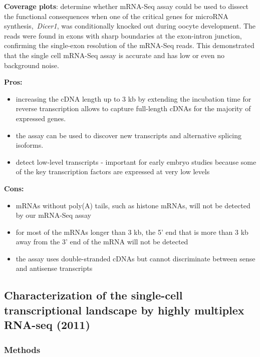 \textbf{Coverage plots}: determine whether mRNA-Seq assay could be used
to dissect the functional consequences when one of the critical genes
for microRNA synthesis,~\emph{Dicer1}, was conditionally knocked out
during oocyte development. The reads were found in exons with sharp
boundaries at the exon-intron junction, confirming the single-exon
resolution of the mRNA-Seq reads. This demonstrated that the single cell
mRNA-Seq assay is accurate and has low or even no background noise.

\textbf{Pros:}

\begin{itemize}
\tightlist
\item
  increasing the cDNA length up to 3 kb by extending the incubation time
  for reverse transcription allows to capture full-length cDNAs for the
  majority of expressed genes.
\item
  the assay can be used to discover new transcripts and alternative
  splicing isoforms.
\item
  detect low-level transcripts - important for early embryo studies
  because some of the key transcription factors are expressed at very
  low levels
\end{itemize}

\textbf{Cons:}

\begin{itemize}
\tightlist
\item
  mRNAs without poly(A) tails, such as histone mRNAs, will not be
  detected by our mRNA-Seq assay
\item
  for most of the mRNAs longer than 3 kb, the 5' end that is more than 3
  kb away from the 3' end of the mRNA will not be detected
\item
  the assay uses double-stranded cDNAs but cannot discriminate between
  sense and antisense transcripts
\end{itemize}

\hypertarget{characterization-of-the-single-cell-transcriptional-landscape-by-highly-multiplex-rna-seq-2011}{%
\subsection{Characterization of the single-cell transcriptional
landscape by highly multiplex RNA-seq
(2011)}\label{characterization-of-the-single-cell-transcriptional-landscape-by-highly-multiplex-rna-seq-2011}}

\hypertarget{methods}{%
\subsubsection{Methods}\label{methods}}

